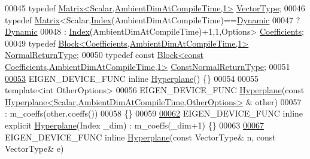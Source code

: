 \begin{DoxyCode}
00045   \textcolor{keyword}{typedef} \hyperlink{group___core___module}{Matrix<Scalar,AmbientDimAtCompileTime,1>} 
      \hyperlink{group___core___module}{VectorType};
00046   \textcolor{keyword}{typedef} \hyperlink{group___core___module_class_eigen_1_1_matrix}{Matrix}<Scalar,\hyperlink{group___geometry___module_a58d2307d16128a0026021374e9e10465}{Index}(AmbientDimAtCompileTime)==\hyperlink{namespace_eigen_ad81fa7195215a0ce30017dfac309f0b2}{Dynamic}
00047                         ? \hyperlink{namespace_eigen_ad81fa7195215a0ce30017dfac309f0b2}{Dynamic}
00048                         : \hyperlink{group___geometry___module_a58d2307d16128a0026021374e9e10465}{Index}(AmbientDimAtCompileTime)+1,1,Options> 
      \hyperlink{group___core___module}{Coefficients};
00049   \textcolor{keyword}{typedef} \hyperlink{group___core___module_class_eigen_1_1_block}{Block<Coefficients,AmbientDimAtCompileTime,1>} 
      \hyperlink{group___core___module_class_eigen_1_1_block}{NormalReturnType};
00050   \textcolor{keyword}{typedef} \textcolor{keyword}{const} \hyperlink{group___core___module_class_eigen_1_1_block}{Block<const Coefficients,AmbientDimAtCompileTime,1>}
       \hyperlink{group___core___module_class_eigen_1_1_block}{ConstNormalReturnType};
00051 
\hyperlink{group___geometry___module_a98d2a770332eec864a897a8ef5bb6025}{00053}   EIGEN\_DEVICE\_FUNC \textcolor{keyword}{inline} \hyperlink{group___geometry___module_a98d2a770332eec864a897a8ef5bb6025}{Hyperplane}() \{\}
00054   
00055   \textcolor{keyword}{template}<\textcolor{keywordtype}{int} OtherOptions>
00056   EIGEN\_DEVICE\_FUNC \hyperlink{group___geometry___module_a98d2a770332eec864a897a8ef5bb6025}{Hyperplane}(\textcolor{keyword}{const} 
      \hyperlink{group___geometry___module_class_eigen_1_1_hyperplane}{Hyperplane<Scalar,AmbientDimAtCompileTime,OtherOptions>}
      & other)
00057    : m\_coeffs(other.coeffs())
00058   \{\}
00059 
\hyperlink{group___geometry___module_a9d99b8b94daa237d51e078e85fe02e2b}{00062}   EIGEN\_DEVICE\_FUNC \textcolor{keyword}{inline} \textcolor{keyword}{explicit} \hyperlink{group___geometry___module_a9d99b8b94daa237d51e078e85fe02e2b}{Hyperplane}(Index \_dim) : m\_coeffs(\_dim+1) \{\}
00063 
\hyperlink{group___geometry___module_a4ffbf274b428ed80ccb1041db753df74}{00067}   EIGEN\_DEVICE\_FUNC \textcolor{keyword}{inline} \hyperlink{group___geometry___module_a4ffbf274b428ed80ccb1041db753df74}{Hyperplane}(\textcolor{keyword}{const} VectorType& n, \textcolor{keyword}{const} VectorType& e)

\end{DoxyCode}
